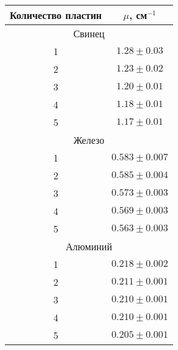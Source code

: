 \begin{tabular}{cc}
\toprule
Количество пластин & $\mu$, см$^{-1}$ \\
\midrule
\multicolumn{2}{c}{Свинец} \\
\midrule
1 & $1.28  \pm 0.03 $ \\
2 & $1.23  \pm 0.02 $ \\
3 & $1.20  \pm 0.01 $ \\
4 & $1.18  \pm 0.01 $ \\
5 & $1.17  \pm 0.01 $ \\
\midrule
\multicolumn{2}{c}{Железо} \\
\midrule
1 & $0.583 \pm 0.007$ \\
2 & $0.585 \pm 0.004$ \\
3 & $0.573 \pm 0.003$ \\
4 & $0.569 \pm 0.003$ \\
5 & $0.563 \pm 0.003$ \\
\midrule
\multicolumn{2}{c}{Алюминий} \\
\midrule
1 & $0.218 \pm 0.002$ \\
2 & $0.211 \pm 0.001$ \\
3 & $0.210 \pm 0.001$ \\
4 & $0.210 \pm 0.001$ \\
5 & $0.205 \pm 0.001$ \\
\bottomrule
\end{tabular}
